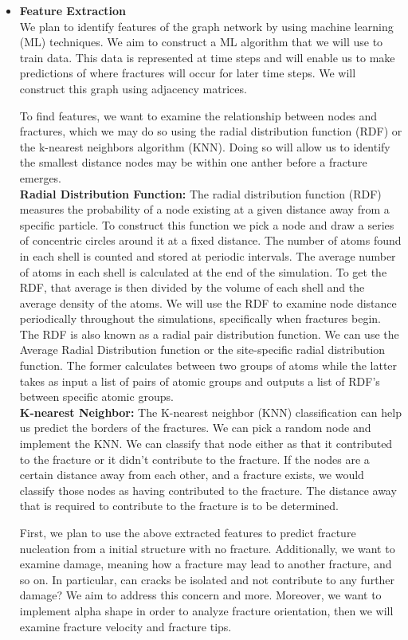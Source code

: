 \begin{itemize} \item \textbf{Feature Extraction} 
\bigskip
\\
We plan to identify features of the graph network by using machine learning (ML) techniques. We aim to construct a ML algorithm that we will use to train data. This data is represented at time steps and will enable us to make predictions of where fractures will occur for later time steps. We will construct this graph using adjacency matrices.

To find features, we want to examine the relationship between nodes and fractures, which we may do so using the radial distribution function (RDF) or the k-nearest neighbors algorithm (KNN). Doing so will allow us to identify the smallest distance nodes may be within one anther before a fracture emerges.
\bigskip
\\
\textbf{Radial Distribution Function:} The radial distribution function (RDF) measures the probability of a node existing at a given distance away from a specific particle. To construct this function we pick a node and draw a series of concentric circles around it at a fixed distance. The number of atoms found in each shell is counted and stored at periodic intervals. The average number of atoms in each shell is calculated at the end of the simulation. To get the RDF, that average is then divided by the volume of each shell and the average density of the atoms. We will use the RDF to examine node distance periodically throughout the simulations, specifically when fractures begin. The RDF is also known as a radial pair distribution function. We can use the Average Radial Distribution function or the site-specific radial distribution function. The former calculates between two groups of atoms while the latter takes as input a list of pairs of atomic groups and outputs a list of RDF's between specific atomic groups.
\bigskip
\\
\textbf{K-nearest Neighbor:} The K-nearest neighbor (KNN) classification can help us predict the borders of the fractures. We can pick a random node and implement the KNN. We can classify that node either as that it contributed to the fracture or it didn't contribute to the fracture. If the nodes are a certain distance away from each other, and a fracture exists, we would classify those nodes as having contributed to the fracture. The distance away that is required to contribute to the fracture is to be determined.
    

First, we plan to use the above extracted features to predict fracture nucleation from a initial structure with no fracture. Additionally, we want to examine damage, meaning how a fracture may lead to another fracture, and so on. In particular, can cracks be isolated and not contribute to any further damage? We aim to address this concern and more. Moreover, we want to implement alpha shape in order to analyze fracture orientation, then we will examine fracture velocity and fracture tips.


\end{itemize}
